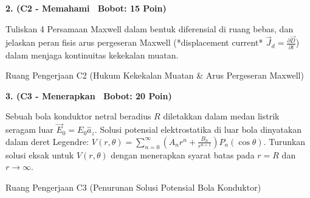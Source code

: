 \documentclass[10pt,a4paper]{article}
\begin{document}
\vspace{1mm}

\noindent\textbf{2. (C2 - Memahami \textbar\ Bobot: 15 Poin)}\par\vspace{0.5mm}
{\footnotesize Tuliskan 4 Persamaan Maxwell dalam bentuk diferensial di ruang bebas, dan jelaskan peran fisis arus pergeseran Maxwell (*displacement current* $\vec{J}_d = \frac{\partial \vec{D}}{\partial t}$) dalam menjaga kontinuitas kekekalan muatan.}
\begin{answerbox}{Ruang Pengerjaan C2 (Hukum Kekekalan Muatan \& Arus Pergeseran Maxwell)}
  \vspace{2.1cm}
\end{answerbox}

\vspace{1mm}

\noindent\textbf{3. (C3 - Menerapkan \textbar\ Bobot: 20 Poin)}\par\vspace{0.5mm}
\noindent\begin{minipage}[t]{0.60\textwidth}%
  {\footnotesize Sebuah bola konduktor netral beradius $R$ diletakkan dalam medan listrik seragam luar $\vec{E}_0 = E_0 \hat{a}_z$. Solusi potensial elektrostatika di luar bola dinyatakan dalam deret Legendre: $V(r,\theta) = \sum_{n=0}^\infty \left( A_n r^n + \frac{B_n}{r^{n+1}} \right) P_n(\cos\theta)$. Turunkan solusi eksak untuk $V(r,\theta)$ dengan menerapkan syarat batas pada $r=R$ dan $r \to \infty$.}%
\end{minipage}%
\hfill%
\begin{minipage}[t]{0.37\textwidth}%
  \centering
\end{minipage}\par\vspace{1mm}
\begin{answerbox}{Ruang Pengerjaan C3 (Penurunan Solusi Potensial Bola Konduktor)}
  \vspace{2.8cm}
\end{answerbox}
\end{document}

